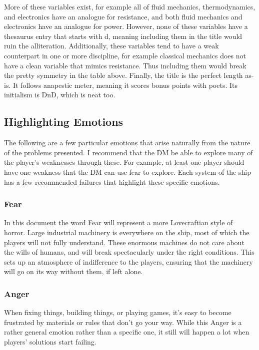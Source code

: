 \documentclass[a4paper]{article}
\begin{document}
More of these variables exist, for example all of fluid mechanics, thermodynamics, and electronics have an analogue for resistance, and both fluid mechanics and electronics have an analogue for power. However, none of these variables have a thesaurus entry that starts with d, meaning including them in the title would ruin the alliteration. Additionally, these variables tend to have a weak counterpart in one or more discipline, for example classical mechanics does not have a clean variable that mimics resistance. Thus including them would break the pretty symmetry in the table above. Finally, the title is the perfect length as-is. It follows anapestic meter, meaning it scores bonus points with poets. Its initialism is DnD, which is neat too.


\subsection{Highlighting Emotions}

The following are a few particular emotions that arise naturally from the nature of the problems presented. I recommend that the DM be able to explore many of the player's weaknesses through these. For example, at least one player should have one weakness that the DM can use fear to explore. Each system of the ship has a few recommended failures that highlight these specific emotions.

\subsubsection{Fear} \label{fear}

In this document the word Fear will represent a more Lovecraftian style of horror. Large industrial machinery is everywhere on the ship, most of which the players will not fully understand. These enormous machines do not care about the wills of humans, and will break spectacularly under the right conditions. This sets up an atmosphere of indifference to the players, ensuring that the machinery will go on its way without them, if left alone. 

\subsubsection{Anger} \label{anger}

When fixing things, building things, or playing games, it's easy to become frustrated by materials or rules that don't go your way. While this Anger is a rather general emotion rather than a specific one, it still will happen a lot when players' solutions start failing. 
\end{document}

